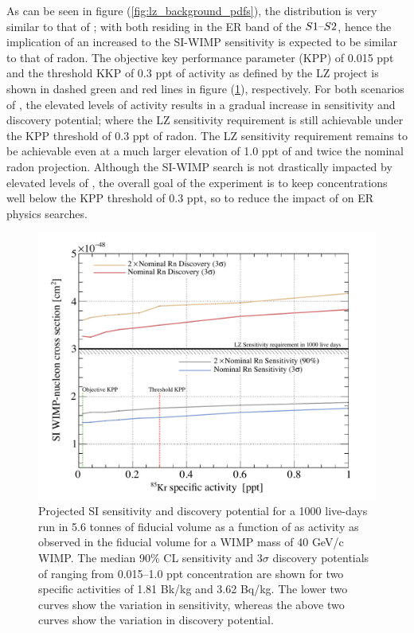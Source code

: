 {As can be seen in figure (\ref{fig:lz_background_pdfs}), the \KrEF{} distribution is very similar to that of \RnTTT{}; with both residing in the ER band of the $S1\text{--}{}S2$, hence the implication of an increased \KrEF{} to the SI-WIMP sensitivity is expected to be similar to that of radon. The objective key performance parameter (KPP) of 0.015 ppt and the threshold KKP of 0.3 ppt of \KrEF{} activity as defined by the LZ project is shown in dashed green and red lines in figure (\ref{fig:krypton_sensitivity_discovery}), respectively. For both scenarios of \RnTTT{}, the elevated levels of \KrEF{} activity results in a gradual increase in sensitivity and discovery potential; where the LZ sensitivity requirement is still achievable under the KPP threshold of 0.3 ppt of radon. The LZ sensitivity requirement remains to be achievable even at a much larger elevation of 1.0 ppt of \KrEF{} and twice the nominal radon projection. Although the SI-WIMP search is not drastically impacted by elevated levels of \KrEF{}, the overall goal of the experiment is to keep \KrEF{} concentrations well below the KPP threshold of 0.3 ppt, so to reduce the impact of \KrEF{} on ER physics searches.

%
\begin{figure}[h!]
    \centering
    \includegraphics[scale=0.8]{Chapter_5/Figures/sensitivity_studies/lz_krypton_vs_sensitivity.pdf}
    \caption[Projected SI sensitivity and discovery potential for a 1000 live-days run in 5.6 tonnes of fiducial volume as a function of \KrEF{} as activity as observed in the fiducial volume for a WIMP mass of 40 GeV/c\squared{} WIMP.]%
    {Projected SI sensitivity and discovery potential for a 1000 live-days run in 5.6 tonnes of fiducial volume as a function of \KrEF{} as activity as observed in the fiducial volume for a WIMP mass of 40 GeV/c\squared{} WIMP. The median 90\% CL sensitivity and $3\sigma$ discovery potentials of \KrEF{} ranging from 0.015--1.0 ppt concentration are shown for two \RnTTT{} specific activities of 1.81 \micro{}Bk/kg and 3.62 \micro{}Bq/kg. The lower two curves show the variation in sensitivity, whereas the above two curves show the variation in discovery potential.}
    \label{fig:krypton_sensitivity_discovery}
\end{figure}
%

}
